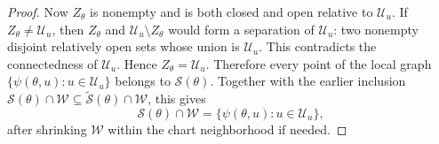 \documentclass{article}
\theoremstyle{normaltheorem}
\newcommand{\calS}{\mathcal{S}}
\begin{document}
\begin{proof}
		Now \(Z_\theta\) is nonempty and is both closed and open relative to \(\mathcal U_u\). If
		\(Z_\theta\neq\mathcal U_u\), then \(Z_\theta\) and \(\mathcal U_u\setminus Z_\theta\) would form a separation of
		\(\mathcal U_u\): two nonempty disjoint relatively open sets whose union is \(\mathcal U_u\). This contradicts the
		connectedness of \(\mathcal U_u\). Hence \(Z_\theta=\mathcal U_u\). Therefore every point of the local graph
		\(\{\psi(\theta,u):u\in\mathcal U_u\}\) belongs to \(\calS(\theta)\). Together with the earlier inclusion
		\(\calS(\theta)\cap\mathcal W\subseteq\widetilde{\calS}(\theta)\cap\mathcal W\), this gives
		\[
		\calS(\theta)\cap\mathcal W
		=
		\{\psi(\theta,u):u\in\mathcal U_u\},
		\]
		after shrinking \(\mathcal W\) within the chart neighborhood if needed.
		\end{proof}
\end{document}
